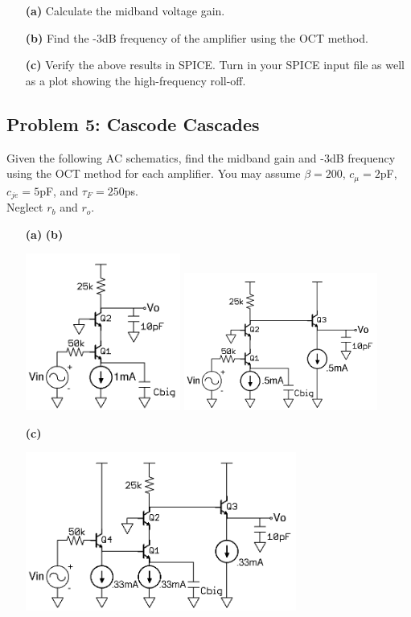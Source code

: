 \documentclass[11pt,twoside]{article}
\begin{document}
\begin{enumerate}
	\item[\bf(a)] Calculate the midband voltage gain.
	\item[\bf(b)] Find the -3dB frequency of the amplifier using the OCT method.
	\item[\bf(c)] Verify the above results in SPICE.  Turn in your SPICE input file as well as a plot showing the high-frequency roll-off.
\end{enumerate}

\subsection*{Problem 5: Cascode Cascades}
Given the following AC schematics, find the midband gain and -3dB frequency using the OCT method for each amplifier. 
You may assume $\beta=200$, $c_\mu=2$pF, $c_{je}=5$pF, and $\tau_F=250$ps.\\
Neglect $r_b$ and $r_o$.
\begin{enumerate}
	\item[\bf(a)] \hspace{3in} {\bf(b)}
\begin{center}
\includegraphics[width=0.4\textwidth]{cascode.png}
\includegraphics[width=0.5\textwidth]{cascode-ef.png}
\end{center}
	\item[\bf(c)]
\begin{center}
\includegraphics[width=0.7\textwidth]{ef-cascode-ef.png}
\end{center}
\end{enumerate}
\clearpage
\end{document}
